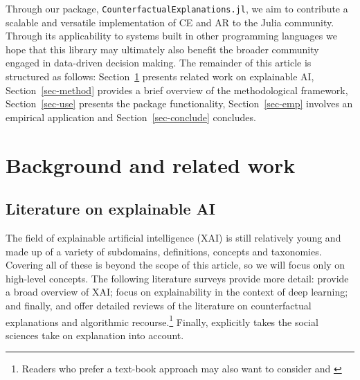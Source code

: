 \documentclass{juliacon}
\begin{document}
Through our package, \texttt{CounterfactualExplanations.jl}, we aim to
contribute a scalable and versatile implementation of CE and AR to the
Julia community. Through its applicability to systems built in other
programming languages we hope that this library may ultimately also
benefit the broader community engaged in data-driven decision making.
The remainder of this article is structured as follows:
Section~\ref{sec-related} presents related work on explainable AI,
Section~\ref{sec-method} provides a brief overview of the methodological
framework, Section~\ref{sec-use} presents the package functionality,
Section~\ref{sec-emp} involves an empirical application and
Section~\ref{sec-conclude} concludes.

\hypertarget{sec-related}{%
\section{Background and related work}\label{sec-related}}

\hypertarget{literature-on-explainable-ai}{%
\subsection{Literature on explainable
AI}\label{literature-on-explainable-ai}}

The field of explainable artificial intelligence (XAI) is still
relatively young and made up of a variety of subdomains, definitions,
concepts and taxonomies. Covering all of these is beyond the scope of
this article, so we will focus only on high-level concepts. The
following literature surveys provide more detail:
\cite{arrieta2020explainable} provide a broad overview of XAI;
\cite{fan2020interpretability} focus on explainability in the context of
deep learning; and finally, \cite{karimi2020survey} and
\cite{verma2020counterfactual} offer detailed reviews of the literature
on counterfactual explanations and algorithmic recourse.\footnote{Readers
  who prefer a text-book approach may also want to consider
  \cite{molnar2020interpretable} and \cite{varshney2022trustworthy}}
Finally, \cite{miller2019explanation} explicitly takes the social
sciences take on explanation into account.
\end{document}
